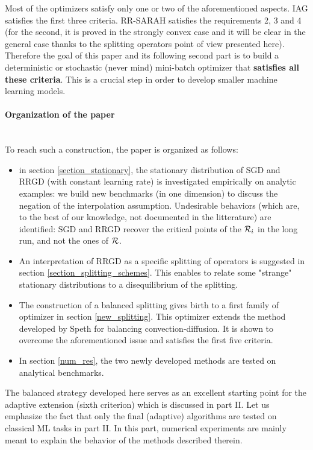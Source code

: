 Most of the optimizers satisfy only one or two of the aforementioned aspects. IAG satisfies the first three criteria. RR-SARAH satisfies the requirements 2, 3 and 4 (for the
second, it is proved in the strongly convex case and it will be clear in the general case thanks to the splitting operators point of view presented here). 
Therefore the goal of this paper and its following second part is to build a deterministic or stochastic (never mind) mini-batch optimizer that \textbf{satisfies all these criteria}. This is a crucial step in order to develop smaller machine learning models. 

\paragraph{Organization of the paper}
~~\\
To reach such a construction, the paper is organized as follows:
\begin{itemize}
	\item in section \ref{section_stationary}, the stationary distribution of SGD and RRGD (with constant learning rate) is investigated empirically on analytic examples: we build new benchmarks (in one
          dimension) to discuss the negation of the interpolation assumption. Undesirable behaviors (which are, to the best of our knowledge, not documented in the litterature) are
          identified: SGD and RRGD recover the critical points of the $\mathcal{R}_i$ in the long run, and not the ones of $\mathcal{R}$. 
        \item An interpretation of RRGD as a specific splitting of operators is suggested in section \ref{section_splitting_schemes}. This enables to relate some "strange" stationary distributions to a disequilibrium of the splitting. 
	\item The construction of a balanced splitting gives birth to a first family of optimizer in section \ref{new_splitting}. This optimizer extends the method developed by Speth \cite{rebalanced_splitting} for balancing convection-diffusion. It is shown to overcome the aforementioned issue and satisfies the first five criteria.
	\item In section \ref{num_res}, the two newly developed methods are tested on analytical benchmarks. 
\end{itemize}

The balanced strategy developed here serves as an excellent starting point for the adaptive extension (sixth criterion) which is discussed in part II. Let us emphasize the fact
that only the final (adaptive) algorithms are tested on classical ML tasks in part II. In this part, numerical experiments are mainly meant to explain the behavior of the methods described therein.

